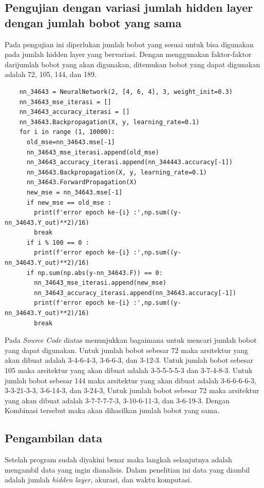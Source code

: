 \subsection{Pengujian dengan variasi jumlah hidden layer dengan jumlah bobot yang sama}

Pada pengujian ini diperlukan jumlah bobot yang sesuai untuk bisa digunakan pada jumlah hidden layer yang bervariasi. Dengan menggunakan faktor-faktor darijumlah bobot yang akan digunakan, ditemukan bobot yang dapat digunakan adalah 72, 105, 144, dan 189.

\begin{lstlisting}
    nn_34643 = NeuralNetwork(2, [4, 6, 4], 3, weight_init=0.3)
    nn_34643_mse_iterasi = []
    nn_34643_accuracy_iterasi = []
    nn_34643.Backpropagation(X, y, learning_rate=0.1)
    for i in range (1, 10000):
      old_mse=nn_34643.mse[-1]
      nn_34643_mse_iterasi.append(old_mse)
      nn_34643_accuracy_iterasi.append(nn_344443.accuracy[-1])
      nn_34643.Backpropagation(X, y, learning_rate=0.1)
      nn_34643.ForwardPropagation(X)
      new_mse = nn_34643.mse[-1]
      if new_mse == old_mse :
        print(f'error epoch ke-{i} :',np.sum((y-nn_34643.Y_out)**2)/16)
        break
      if i % 100 == 0 :
        print(f'error epoch ke-{i} :',np.sum((y-nn_34643.Y_out)**2)/16)
      if np.sum(np.abs(y-nn_34643.F)) == 0:
        nn_34643_mse_iterasi.append(new_mse)
        nn_34643_accuracy_iterasi.append(nn_34643.accuracy[-1])
        print(f'error epoch ke-{i} :',np.sum((y-nn_34643.Y_out)**2)/16)
        break
\end{lstlisting}
Pada \textit{Source Code} diatas menunjukkan bagaimana untuk mencari jumlah bobot yang dapat digunakan. Untuk jumlah bobot sebesar 72 maka arsitektur yang akan dibuat adalah 3-4-6-4-3, 3-6-6-3, dan 3-12-3. Untuk jumlah bobot sebesar 105 maka arsitektur yang akan dibuat adalah 3-5-5-5-5-3 dan 3-7-4-8-3. Untuk jumlah bobot sebesar 144 maka arsitektur yang akan dibuat adalah 3-6-6-6-6-3, 3-3-21-3-3, 3-6-14-3, dan 3-24-3, Untuk jumlah bobot sebesar 72 maka arsitektur yang akan dibuat adalah 3-7-7-7-7-3, 3-10-6-11-3, dan 3-6-19-3. Dengan Kombinasi tersebut maka akan dihasilkan jumlah bobot yang sama.

\subsection{Pengambilan data}
Setelah program sudah diyakini benar maka langkah selanjutnya adalah mengambil data yang ingin dianalisis. Dalam penelitian ini data yang diambil adalah jumlah \textit{hidden layer}, akurasi, dan waktu komputasi.